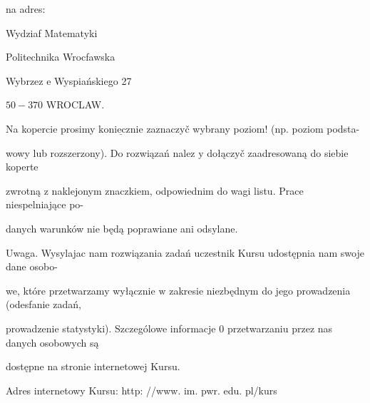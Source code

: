 \documentclass[a4paper,12pt]{article}
\begin{document}
na adres:

Wydziaf Matematyki

Politechnika Wrocfawska

Wybrzez $\mathrm{e}$ Wyspiańskiego 27

$50-370$ WROCLAW.

Na kopercie prosimy $\underline{\mathrm{k}\mathrm{o}\mathrm{n}\mathrm{i}\mathrm{e}\mathrm{c}\mathrm{z}\mathrm{n}\mathrm{i}\mathrm{e}}$ zaznaczyč wybrany poziom! (np. poziom podsta-

wowy lub rozszerzony). Do rozwiązań nalez $\mathrm{y}$ dołączyč zaadresowaną do siebie koperte

zwrotną $\mathrm{z}$ naklejonym znaczkiem, odpowiednim do wagi listu. Prace niespelniające po-

danych warunków nie będą poprawiane ani odsylane.

Uwaga. Wysylajac nam rozwiązania zadań uczestnik Kursu udostępnia nam swoje dane osobo-

we, które przetwarzamy wyłącznie $\mathrm{w}$ zakresie niezbędnym do jego prowadzenia (odesfanie zadań,

prowadzenie statystyki). Szczególowe informacje $0$ przetwarzaniu przez nas danych osobowych są

dostępne na stronie internetowej Kursu.

Adres internetowy Kursu: http: //www. im. pwr. edu. pl/kurs
\end{document}
